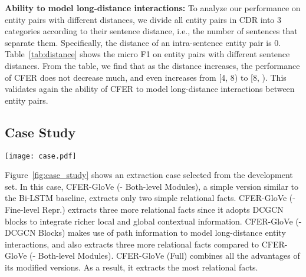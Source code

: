 \documentclass{article}
\begin{document}
\noindent\textbf{Ability to model long-distance interactions: }
To analyze our performance on entity pairs with different distances, we divide all entity pairs in CDR into 3 categories according to their sentence distance, i.e., the number of sentences that separate them. 
Specifically, the distance of an intra-sentence entity pair is 0. 
Table~\ref{tab:distance} shows the micro F1 on entity pairs with different sentence distances. 
From the table, we find that as the distance increases, the performance of CFER does not decrease much, and even increases from [4, 8) to [8, ). 
This validates again the ability of CFER to model long-distance interactions between entity pairs. 

\subsection{Case Study}

\begin{figure*}[ht]
\centering
\texttt{[image: case.pdf]}
\caption{
An extraction case from the development set. 
We show the relational facts extracted by four versions of CFER-GloVe. 
For CFER-GloVe (Full) and CFER-GloVe (- DCGCN Blocks), we additionally show the paths along with their attention weights used for producing fine-level representations of entity 0 (Daniel Ajayi Adeniran) and entity 5 (Redeemed Christian Church). 
}
\label{fig:case_study}
\end{figure*}

Figure~\ref{fig:case_study} shows an extraction case selected from the development set. 
In this case, CFER-GloVe (- Both-level Modules), a simple version similar to the Bi-LSTM baseline, extracts only two simple relational facts. 
CFER-GloVe (- Fine-level Repr.) extracts three more relational facts since it adopts DCGCN blocks to integrate richer local and global contextual information. 
CFER-GloVe (- DCGCN Blocks) makes use of path information to model long-distance entity interactions, and also extracts three more relational facts compared to CFER-GloVe (- Both-level Modules). 
CFER-GloVe (Full) combines all the advantages of its modified versions. 
As a result, it extracts the most relational facts. 
\end{document}
